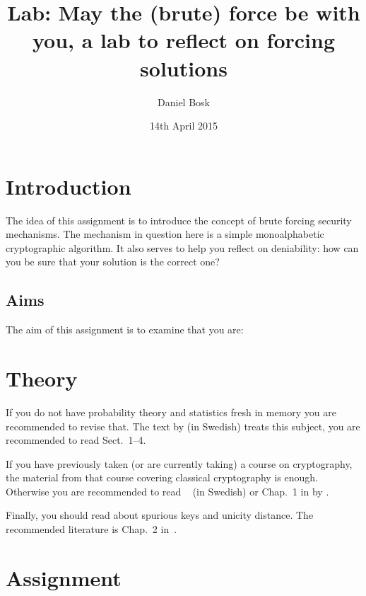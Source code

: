 \documentclass[a4paper]{article}
\title{Lab: May the (brute) force be with you, a lab to reflect on forcing 
  solutions}
\author{%
  Daniel Bosk
}
\institute{%
  Department of Information and Communication Systems\\
  Mid Sweden University, SE-851\,70 Sundsvall
}
\date{14th April 2015}
\begin{document}
\maketitle
\begin{abstract}
  
\end{abstract}


\section{Introduction}

The idea of this assignment is to introduce the concept of brute forcing 
security mechanisms.
The mechanism in question here is a simple monoalphabetic cryptographic 
algorithm.
It also serves to help you reflect on deniability: how can you be sure that 
your solution is the correct one?

\subsection{Aims}

The aim of this assignment is to examine that you are:
\begin{itemize}
  
\end{itemize}


\section{Theory}

If you do not have probability theory and statistics fresh in memory you are 
recommended to revise that.
The text  by \citet{kthsannolikhet} (in Swedish) 
treats this subject, you are recommended to read Sect.~1--4.

If you have previously taken (or are currently taking) a course on 
cryptography, the material from that course covering classical cryptography is 
enough.
Otherwise you are recommended to read 
~\cite{Bosk2013itn} (in Swedish) or Chap.~1 in 
 by \citet{Stinson2006cta}.

Finally, you should read about spurious keys and unicity distance.
The recommended literature is Chap.~2 in~\cite{Stinson2006cta}.


\section{Assignment}
\end{document}

